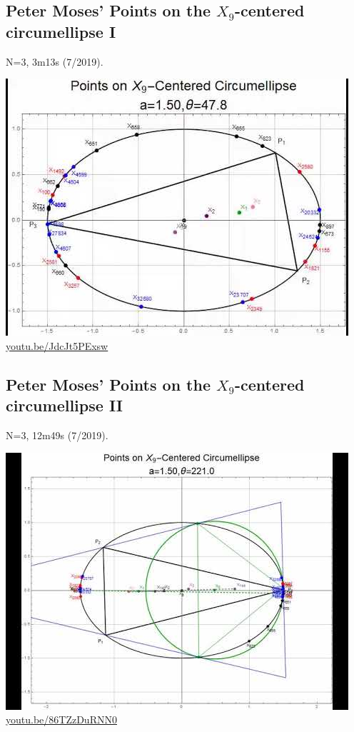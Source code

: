 \documentclass[12pt]{amsart}
\begin{document}
\subsection{Peter Moses' Points on the $X_{9}$-centered circumellipse I}
\label{vid:JdcJt5PExsw}
\noindent N=3, 3m13s (7/2019). 
\begin{center}\includegraphics[width=.5\textwidth]{pics/JdcJt5PExsw.jpg} \\ 
\href{https://youtu.be/JdcJt5PExsw}{\url{youtu.be/JdcJt5PExsw}}\end{center}
% 

\subsection{Peter Moses' Points on the $X_{9}$-centered circumellipse II}
\label{vid:86TZzDuRNN0}
\noindent N=3, 12m49s (7/2019). 
\begin{center}\includegraphics[width=.5\textwidth]{pics/86TZzDuRNN0.jpg} \\ 
\href{https://youtu.be/86TZzDuRNN0}{\url{youtu.be/86TZzDuRNN0}}\end{center}
% 
\end{document}
